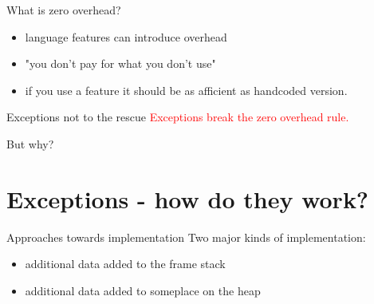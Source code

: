 \documentclass[10pt]{beamer}
\begin{document}
\begin{frame}{What is zero overhead?}
	\begin{itemize}[<+- | alert@+>]
		\item language features {\color{amethyst}can} introduce overhead
		\item "you don't pay for what you don't use"
		\item if you use a feature it should be as afficient as handcoded version.
	\end{itemize}
\end{frame}

\begin{frame}{Exceptions not to the rescue}
		\centering
		\textcolor{red}{Exceptions break the zero overhead rule.}
		
		But why?
\end{frame}

\section{Exceptions - how do they work?}

\begin{frame}{Approaches towards implementation}
	Two major kinds of implementation:
	\begin{itemize}[<+- | alert@+>]
		\item additional data added to the frame stack
		\item additional data added to someplace on the heap
	\end{itemize}
\end{frame}
	
\end{document}

